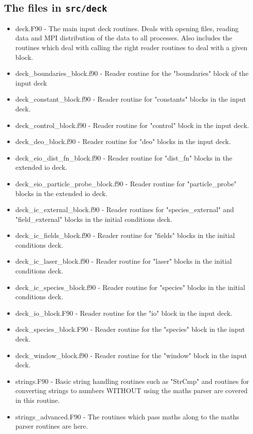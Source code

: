 \documentclass[12pt]{article}
\newcommand{\inlinecode}[1]{{\color{warwickred} \bf\texttt{#1}}}
\begin{document}
\subsection{The files in \inlinecode{src/deck}}
\begin{itemize}
\item deck.F90 - The main input deck routines. Deals with opening files,
  reading data and MPI distribution of the data to all processes. Also
  includes the routines which deal with calling the right reader routines to
  deal with a given block.
\item deck\_boundaries\_block.f90 - Reader routine for the "boundaries" block
  of the input deck
\item deck\_constant\_block.f90 - Reader routine for "constants" blocks in the
  input deck.
\item deck\_control\_block.f90 - Reader routine for "control" block in the
  input deck.
\item deck\_deo\_block.f90 - Reader routine for "deo" blocks in the input
  deck.
\item deck\_eio\_dist\_fn\_block.f90 - Reader routine for "dist\_fn" blocks in
  the extended io deck.
\item deck\_eio\_particle\_probe\_block.f90 - Reader routine for
  "particle\_probe" blocks in the extended io deck.
\item deck\_ic\_external\_block.f90 - Reader routines for "species\_external"
  and "field\_external" blocks in the initial conditions deck.
\item deck\_ic\_fields\_block.f90 - Reader routine for "fields" blocks in the
  initial conditions deck.
\item deck\_ic\_laser\_block.f90 - Reader routine for "laser" blocks in the
  initial conditions deck.
\item deck\_ic\_species\_block.f90 - Reader routine for "species" blocks in
  the initial conditions deck.
\item deck\_io\_block.F90 - Reader routine for the "io" block in the input
  deck.
\item deck\_species\_block.F90 - Reader routine for the "species" block in the
  input deck.
\item deck\_window\_block.f90 - Reader routine for the "window" block in the
  input deck.
\item strings.F90 - Basic string handling routines such as "StrCmp" and
  routines for converting strings to numbers WITHOUT using the maths parser
  are covered in this routine.
\item strings\_advanced.F90 - The routines which pass maths along to the maths
  parser routines are here.
\end{itemize}
\end{document}
